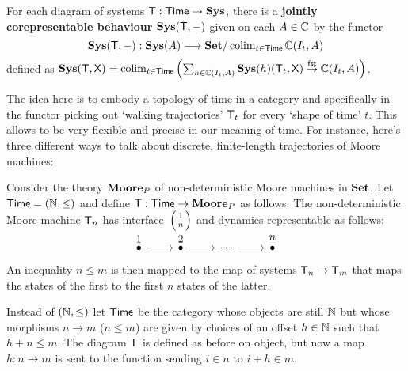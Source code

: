 \begin{proposition}
	For each diagram of systems $\mathsf{T} : \mathsf{Time} \to {\mathbf{Sys}}$, there is a \textbf{jointly corepresentable behaviour} ${\mathbf{Sys}}(\mathsf{T}, -)$ given on each $A \in \Comp$ by the functor
	\begin{equation}
		\Sys(\sys T, -) : \Sys(A) \longto \Set/\colim_{t \in \Time}\Comp(I_t,A)
	\end{equation}
	defined as $\Sys(\sys T, \sys X) = \colim_{t \in \Time} \left(\sum_{h \in \Comp(I_t,A)} \Sys(h)(\sys T_t, \sys X) \nto{\sf fst} \Comp(I_t,A)\right)$.
\end{proposition}

The idea here is to embody a topology of time in a category and specifically in the functor picking out `walking trajectories' $\mathsf{T}_t$ for every `shape of time' $t$.
This allows to be very flexible and precise in our meaning of time.
For instance, here's three different ways to talk about discrete, finite-length trajectories of Moore machines:

\begin{example}
	Consider the theory $\mathbf{Moore}_P$ of non-deterministic Moore machines in $\Set$.
	Let $\mathsf{Time} = (\mathbb{N}, \leq)$ and define $\mathsf{T}:\mathsf{Time} \to \mathbf{Moore}_P$ as follows.
	The non-deterministic Moore machine $\mathsf{T}_n$ has interface\footnotemark~$\lens{1}{n}$ and dynamics representable as follows:
	\begin{equation}
		\begin{tikzcd}[ampersand replacement=\&]
			{\Overset{1}\bullet} \& {\Overset{2}\bullet} \& \cdots \& {\Overset{n}\bullet}
			\arrow[from=1-1, to=1-2]
			\arrow[from=1-2, to=1-3]
			\arrow[from=1-3, to=1-4]
		\end{tikzcd}
	\end{equation}
	An inequality $n \leq m$ is then mapped to the map of systems $\mathsf{T}_n \to \mathsf{T}_m$ that maps the states of the first to the first $n$ states of the latter.
\end{example}

\begin{example}
	Instead of $(\mathbb{N},\leq)$ let $\mathsf{Time}$ be the category whose objects are still $\mathbb{N}$ but whose morphisms $n \to m$ ($n \leq m$) are given by choices of an offset $h \in \mathbb{N}$ such that $h+n \leq m$.
	The diagram $\mathsf{T}$ is defined as before on object, but now a map $h:n \to m$ is sent to the function sending $i \in n$ to $i+h \in m$.
\end{example}

